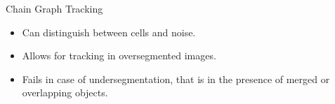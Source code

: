 \begin{frame}{Chain Graph Tracking}
    \begin{itemize}
          \item Can distinguish between cells and noise.
          \item Allows for tracking in oversegmented images.
          \item Fails in case of undersegmentation, that is in the presence of merged or overlapping objects.
    \end{itemize}
\end{frame}


